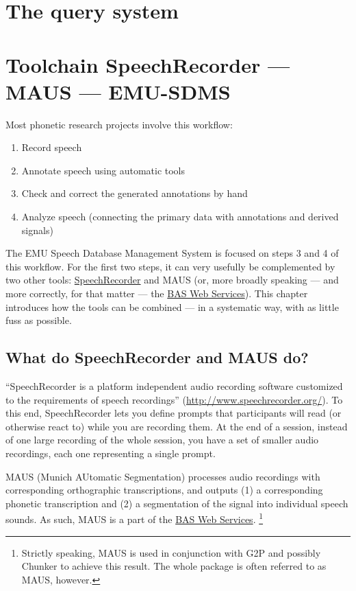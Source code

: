 \documentclass[]{book}
\providecommand{\tightlist}{%
  \setlength{\itemsep}{0pt}\setlength{\parskip}{0pt}}
\let\rmarkdownfootnote\footnote%
\def\footnote{\protect\rmarkdownfootnote}
\theoremstyle{definition}
\theoremstyle{definition}
\theoremstyle{definition}
\theoremstyle{remark}
\begin{document}
\chapter{The query system}\label{the-query-system}

\chapter{Toolchain SpeechRecorder --- MAUS ---
EMU-SDMS}\label{toolchain-speechrecorder-maus-emu-sdms}

Most phonetic research projects involve this workflow:

\begin{enumerate}
\def\labelenumi{\arabic{enumi}.}
\tightlist
\item
  Record speech
\item
  Annotate speech using automatic tools
\item
  Check and correct the generated annotations by hand
\item
  Analyze speech (connecting the primary data with annotations and
  derived signals)
\end{enumerate}

The EMU Speech Database Management System is focused on steps 3 and 4 of
this workflow. For the first two steps, it can very usefully be
complemented by two other tools:
\href{http://www.speechrecorder.org/}{SpeechRecorder} and MAUS (or, more
broadly speaking --- and more correctly, for that matter --- the
\href{https://clarin.phonetik.uni-muenchen.de/BASWebServices}{BAS Web
Services}). This chapter introduces how the tools can be combined --- in
a systematic way, with as little fuss as possible.

\section{What do SpeechRecorder and MAUS
do?}\label{what-do-speechrecorder-and-maus-do}

``SpeechRecorder is a platform independent audio recording software
customized to the requirements of speech recordings''
(\url{http://www.speechrecorder.org/}). To this end, SpeechRecorder lets
you define prompts that participants will read (or otherwise react to)
while you are recording them. At the end of a session, instead of one
large recording of the whole session, you have a set of smaller audio
recordings, each one representing a single prompt.

MAUS (Munich AUtomatic Segmentation) processes audio recordings with
corresponding orthographic transcriptions, and outputs (1) a
corresponding phonetic transcription and (2) a segmentation of the
signal into individual speech sounds. As such, MAUS is a part of the
\href{https://clarin.phonetik.uni-muenchen.de/BASWebServices}{BAS Web
Services}. \footnote{Strictly speaking, MAUS is used in conjunction with
  G2P and possibly Chunker to achieve this result. The whole package is
  often referred to as MAUS, however.}
\end{document}
